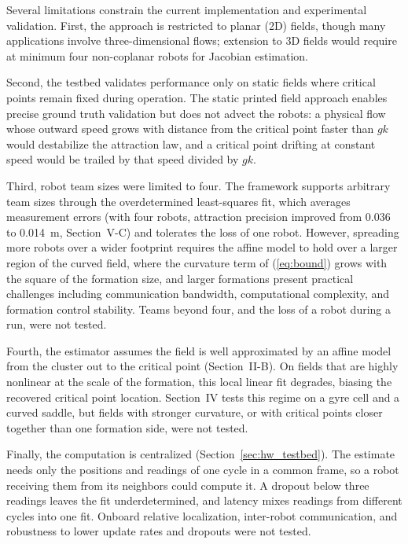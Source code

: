 \documentclass[lettersize,journal]{IEEEtran}
\newcommand{\rev}[1]{#1}
\begin{document}
Several limitations constrain the current implementation and experimental validation. First, the approach is restricted to planar (2D) fields, though many applications involve three-dimensional flows; extension to 3D fields would require at minimum four non-coplanar robots for Jacobian estimation.

Second, the testbed validates performance only on static fields where critical points remain fixed during operation. The static printed field approach enables precise ground truth validation but does not advect the robots: a physical flow whose outward speed grows with distance from the critical point faster than $gk$ would destabilize the attraction law, and a critical point drifting at constant speed would be trailed by that speed divided by $gk$.

Third, robot team sizes were limited to four. The framework supports arbitrary team sizes through the overdetermined least-squares fit, which averages measurement errors (with four robots, attraction precision improved from \rev{0.036} to \rev{0.014}~m, Section~V-C) and tolerates the loss of one robot. However, spreading more robots over a wider footprint requires the affine model to hold over a larger region of the curved field, where the curvature term of (\ref{eq:bound}) grows with the square of the formation size, and larger formations present practical challenges including communication bandwidth, computational complexity, and formation control stability. Teams beyond four, and the loss of a robot during a run, were not tested.

Fourth, the estimator assumes the field is well approximated by an affine model from the cluster out to the critical point (Section~II-B). On fields that are highly nonlinear at the scale of the formation, this local linear fit degrades, biasing the recovered critical point location. Section~IV tests this regime on a gyre cell and a curved saddle, but fields with stronger curvature, or with critical points closer together than one formation side, were not tested.

Finally, the computation is centralized (Section~\ref{sec:hw_testbed}). The estimate needs only the positions and readings of one cycle in a common frame, so a robot receiving them from its neighbors could compute it. A dropout below three readings leaves the fit underdetermined, and latency mixes readings from different cycles into one fit. Onboard relative localization, inter-robot communication, and robustness to lower update rates and dropouts were not tested.
\end{document}

